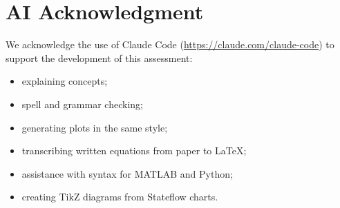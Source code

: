 \section*{AI Acknowledgment}

We acknowledge the use of Claude Code (\url{https://claude.com/claude-code}) to support the development of this assessment:
\begin{itemize}
    \item explaining concepts;
    \item spell and grammar checking;
    \item generating plots in the same style;
    \item transcribing written equations from paper to \LaTeX;
    \item assistance with syntax for MATLAB and Python;
    \item creating TikZ diagrams from Stateflow charts.
\end{itemize}
